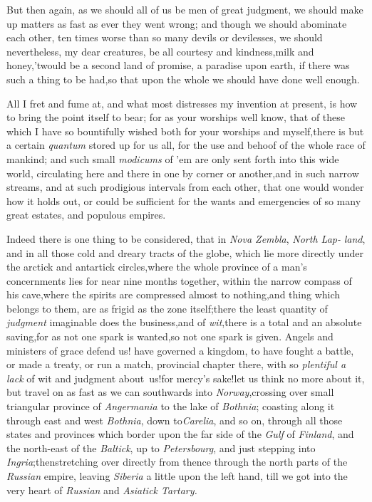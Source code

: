 \documentclass{article}
\begin{document}
But then again, as we should all of us be men of great judgment,
we should make up matters as fast as ever they went wrong; and
though we should abominate each other, ten times worse than so many
devils or devilesses, we should nevertheless, my dear creatures, be
all courtesy and kindness,\tsh milk and honey,\tsh ’twould be a
second land of promise,\tsh\break
a paradise upon earth, if there was
such a thing to be had,\tsk so that upon the whole we should have
done well enough.

All I fret and fume at, and what most distresses my invention at
present, is how to bring the point itself to bear; for as your
worships well know, that of these  which I have so bountifully wished both for your
worships and myself,\tsk there is but a certain \textit{quantum}
stored up for us all, for the use and behoof of the whole race of
mankind; and such small \textit{modicums} of ’em are only sent forth
into this wide world, circulating here and there in one by corner
or another,\tsk and in such narrow streams, and at such prodigious
intervals from each other, that one would wonder how it holds out,
or could be sufficient for the wants and emergencies of so many
great estates, and populous empires.

Indeed there is one thing to be considered, that in \textit{Nova
Zembla}, \textit{North Lap-}\break
\textit{land}, and in all those cold and dreary tracts
of the globe, which lie more directly under the arctick and
antartick circles,\tsh where the whole province of a man’s
concernments lies for near nine months together, within the narrow
compass of his cave,\tsk where the spirits are compressed almost
to nothing,\tsk and 
thing which belongs to them, are as frigid as the zone
itself;\tsk there the least quantity of \textit{judgment} imaginable
does the business,\tsh and of \textit{wit},\tsh there
is a total and an absolute saving,\tsk for as not one spark
is wanted,\tsk so not one spark is given. Angels and ministers of
grace defend us!\break
{}
have governed a kingdom, to have fought a battle, or made a treaty, or
run a match,  provincial
chapter there, with so \textit{plenti\-ful a lack} of wit and judgment
about~us!\@ for mercy’s sake!\@ let us think no more about it,
but travel on as fast as we can southwards into
\textit{Norway},\tsk crossing over
small triangular province of \textit{Angermania} to the
lake of \textit{Bothnia}; coasting along it through east and west
\textit{Bothnia}, down to\break \textit{Carelia}, and so on, through all
those states and provinces which border upon the far side of the
\textit{Gulf} of \textit{Finland}, and the north-east of the
\textit{Baltick}, up to \textit{Petersbourg}, and just stepping into
\textit{Ingria};\tsh then\break stretching over directly from
thence
through the north parts of the \textit{Russian} empire,\tsk
leaving \textit{Siberia} a little upon the left hand, till we
got into the very heart of \textit{Russian} and \textit{Asiatick
Tartary.}
\end{document}
